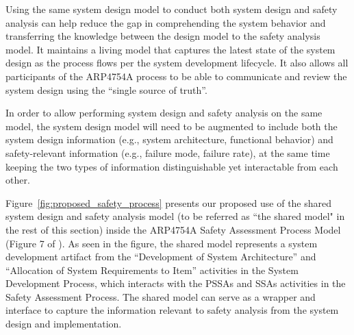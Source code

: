Using the same system design model to conduct both system design and safety analysis can help reduce the gap in comprehending the system behavior and transferring the knowledge between the design model to the safety analysis model. It maintains a living model that captures the latest state of the system design as the process flows per the system development lifecycle.
It also allows all participants of the ARP4754A process to be able to communicate and review the system design using the ``single source of truth''.

In order to allow performing system design and safety analysis on the same model, the system design model will need to be augmented to include both the system design information (e.g., system architecture, functional behavior) and safety-relevant information (e.g., failure mode, failure rate), at the same time keeping the two types of information distinguishable yet interactable from each other.

Figure~\ref{fig:proposed_safety_process}  presents our proposed use of the shared system design and safety analysis model (to be referred as ``the shared model" in the rest of this section) inside the ARP4754A Safety Assessment Process Model (Figure 7 of \cite{SAE:ARP4754A}). As seen in the figure, the shared model represents a system development artifact from the ``Development of System Architecture'' and ``Allocation of System Requirements to Item'' activities in the System Development Process, which interacts with the PSSAs and SSAs activities in the Safety Assessment Process. The shared model can serve as a wrapper and interface to capture the information relevant to safety analysis from the system design and implementation.

